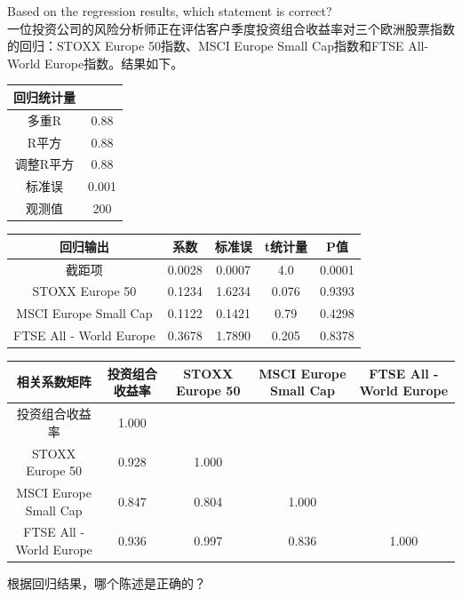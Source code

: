 \documentclass{article}
\newcounter{question} %
\begin{document}
\begin{question}
\begin{center}
    \end{center}
    Based on the regression results, which statement is correct?\\
   一位投资公司的风险分析师正在评估客户季度投资组合收益率对三个欧洲股票指数的回归：STOXX Europe 50指数、MSCI Europe Small Cap指数和FTSE All-World Europe指数。结果如下。
    \begin{center}
    \begin{tabular}{cc}
    回归统计量 &  \\
    \hline
    多重R & 0.88 \\
    R平方 & 0.88 \\
    调整R平方 & 0.88 \\
    标准误 & 0.001 \\
    观测值 & 200 \\
    \end{tabular}
    \end{center}
    \begin{center}
    \begin{tabular}{ccccc}
    回归输出 & 系数 & 标准误 & t统计量 & P值 \\
    \hline
    截距项 & 0.0028 & 0.0007 & 4.0 & 0.0001 \\
    STOXX Europe 50 & 0.1234 & 1.6234 & 0.076 & 0.9393 \\
    MSCI Europe Small Cap & 0.1122 & 0.1421 & 0.79 & 0.4298 \\
    FTSE All - World Europe & 0.3678 & 1.7890 & 0.205 & 0.8378 \\
    \end{tabular}
    \end{center}
    \begin{center}
    \begin{tabular}{ccccc}
    相关系数矩阵 & 投资组合收益率 & STOXX Europe 50 & MSCI Europe Small Cap & FTSE All - World Europe \\
    \hline
    投资组合收益率 & 1.000 &  &  &  \\
    STOXX Europe 50 & 0.928 & 1.000 &  &  \\
    MSCI Europe Small Cap & 0.847 & 0.804 & 1.000 &  \\
    FTSE All - World Europe & 0.936 & 0.997 & 0.836 & 1.000 \\
    \end{tabular}
    \end{center}
    根据回归结果，哪个陈述是正确的？
    \end{question}
    
\end{document}

